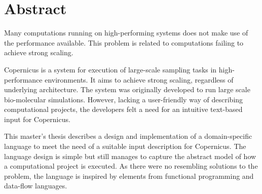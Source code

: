 \begingroup
\let\clearpage\relax
\let\cleardoublepage\relax
\let\cleardoublepage\relax

\chapter*{Abstract}

Many computations running on high-performing systems does not make use
of the performance available. This problem is related to computations
failing to achieve strong scaling.

Copernicus is a system for execution of large-scale sampling tasks in
high-performance environments. It aims to achieve strong scaling,
regardless of underlying architecture. The system was originally
developed to run large scale bio-molecular simulations. However,
lacking a user-friendly way of describing computational projects, the
developers felt a need for an intuitive text-based input for
Copernicus.

This master's thesis describes a design and implementation of a
domain-specific language to meet the need of a suitable input
description for Copernicus. The language design is simple but still
manages to capture the abstract model of how a computational project
is executed. As there were no resembling solutions to the problem, the
language is inspired by elements from functional programming and
data-flow languages.


\endgroup			

\vfill
